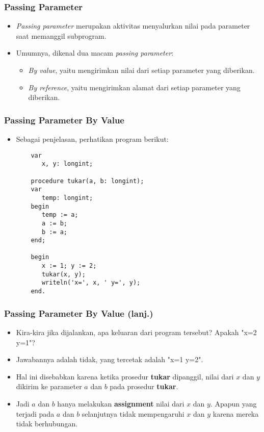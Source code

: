 \documentclass{beamer}
\begin{document}
\begin{frame}
\frametitle{Passing Parameter}
\begin{itemize}
	\item \textit{Passing parameter} merupakan aktivitas menyalurkan nilai pada parameter saat memanggil subprogram.
	\item Umumnya, dikenal dua macam \textit{passing parameter}:
	\begin{itemize}
		\item \textit{By value}, yaitu mengirimkan \alert{nilai} dari setiap parameter yang diberikan.
		\item \textit{By reference}, yaitu mengirimkan \alert{alamat} dari setiap parameter yang diberikan.
	\end{itemize}
\end{itemize}
\end{frame}

\begin{frame}[fragile]
\frametitle{Passing Parameter By Value}
\begin{itemize}
	\item Sebagai penjelasan, perhatikan program berikut:
	\begin{lstlisting}
	var
	   x, y: longint;
	
	procedure tukar(a, b: longint);
	var
	   temp: longint;
	begin
	   temp := a;
	   a := b;
	   b := a;
	end;
	
	begin
	   x := 1; y := 2;
	   tukar(x, y);
	   writeln('x=', x, ' y=', y);
	end.
	\end{lstlisting}
\end{itemize}
\end{frame}

\begin{frame}[fragile]
\frametitle{Passing Parameter By Value (lanj.)}
\begin{itemize}
	\item Kira-kira jika dijalankan, apa keluaran dari program tersebut? Apakah "x=2 y=1"?
	\item Jawabannya adalah \alert{tidak}, yang tercetak adalah "x=1 y=2".
	\item Hal ini disebabkan karena ketika prosedur \textbf{tukar} dipanggil, \alert{nilai} dari $x$ dan $y$ dikirim ke parameter $a$ dan $b$ pada prosedur \textbf{tukar}.
	\item Jadi $a$ dan $b$ hanya melakukan \textbf{assignment} nilai dari $x$ dan $y$. Apapun yang terjadi pada $a$ dan $b$ selanjutnya tidak mempengaruhi $x$ dan $y$ karena mereka \alert{tidak berhubungan}.
\end{itemize}
\end{frame}
\end{document}
